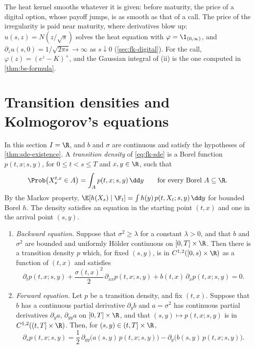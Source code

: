 The heat kernel smooths whatever it is given: before maturity, the price of a digital option,
whose payoff jumps, is as smooth as that of a call. The price of the irregularity is paid near
maturity, where derivatives blow up: $u(s,z)=N(z/\sqrt s)$ solves the heat equation with
$\varphi=\1_{(0,\infty)}$, and $\partial_zu(s,0)=1/\sqrt{2\pi s}\to\infty$ as $s\downarrow0$
(\cref{sec:fk-digital}). For the call, $\varphi(z)=(e^z-K)^+$, and the Gaussian integral of (ii) is the one computed in
\cref{thm:bs-formula}.

\section{Transition densities and Kolmogorov's equations}\label{sec:fk-kolmogorov}

In this section $I=\R$, and $b$ and $\sigma$ are continuous and satisfy the hypotheses of
\cref{thm:sde-existence}. A \emph{transition density} of \eqref{eq:fk-sde} is a Borel function
$p(t,x;s,y)$, for $0\le t<s\le T$ and $x,y\in\R$, such that
\[
  \Prob\big(X^{t,x}_s\in A\big)=\int_Ap(t,x;s,y)\,\dd y\qquad\text{for every Borel }A\subseteq\R .
\]
By the Markov property, $\E[h(X_s)\mid\F_t]=\int h(y)\,p(t,X_t;s,y)\,\dd y$ for bounded Borel $h$.
The density satisfies an equation in the starting point $(t,x)$ and one in the arrival point $(s,y)$.

\begin{theorem}\label{thm:fk-kolmogorov}
\leavevmode
\begin{enumerate}[label=(\roman*)]
  \item \emph{Backward equation.} Suppose that $\sigma^2\ge\lambda$ for a constant $\lambda>0$, and
    that $b$ and $\sigma^2$ are bounded and uniformly H\"older continuous on $[0,T]\times\R$. Then there
    is a transition density $p$ which, for fixed $(s,y)$, is in $C^{1,2}([0,s)\times\R)$ as a
    function of $(t,x)$ and satisfies
    \begin{equation}\label{eq:fk-backward}
      \partial_tp(t,x;s,y)+\frac{\sigma(t,x)^2}{2}\,\partial_{xx}p(t,x;s,y)+b(t,x)\,\partial_xp(t,x;s,y)=0 .
    \end{equation}
  \item \emph{Forward equation.} Let $p$ be a transition density, and fix $(t,x)$. Suppose that
    $b$ has a continuous partial derivative $\partial_yb$ and $a=\sigma^2$ has continuous partial
    derivatives $\partial_ya$, $\partial_{yy}a$ on $[0,T]\times\R$, and that $(s,y)\mapsto p(t,x;s,y)$ is in
    $C^{1,2}((t,T]\times\R)$. Then, for $(s,y)\in(t,T]\times\R$,
    \begin{equation}\label{eq:fk-forward}
      \partial_sp(t,x;s,y)=\frac12\,\partial_{yy}\big(a(s,y)\,p(t,x;s,y)\big)-\partial_y\big(b(s,y)\,p(t,x;s,y)\big).
    \end{equation}
\end{enumerate}
\end{theorem}


